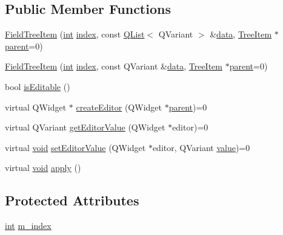 \subsection*{Public Member Functions}
\begin{DoxyCompactItemize}
\item 
\hyperlink{group___u_a_v_object_browser_plugin_ga9ada7d4ed9c60eb20abec8cfc8e99960}{Field\-Tree\-Item} (\hyperlink{ioapi_8h_a787fa3cf048117ba7123753c1e74fcd6}{int} \hyperlink{glext_8h_ab47dd9958bcadea08866b42bf358e95e}{index}, const \hyperlink{class_q_list}{Q\-List}$<$ Q\-Variant $>$ \&\hyperlink{glext_8h_a8850df0785e6fbcc2351af3b686b8c7a}{data}, \hyperlink{class_tree_item}{Tree\-Item} $\ast$\hyperlink{group___u_a_v_object_browser_plugin_gaa3a7ba624312b6be70872634db291881}{parent}=0)
\item 
\hyperlink{group___u_a_v_object_browser_plugin_gab23936d93e6b5a9121347243b8121ddb}{Field\-Tree\-Item} (\hyperlink{ioapi_8h_a787fa3cf048117ba7123753c1e74fcd6}{int} \hyperlink{glext_8h_ab47dd9958bcadea08866b42bf358e95e}{index}, const Q\-Variant \&\hyperlink{glext_8h_a8850df0785e6fbcc2351af3b686b8c7a}{data}, \hyperlink{class_tree_item}{Tree\-Item} $\ast$\hyperlink{group___u_a_v_object_browser_plugin_gaa3a7ba624312b6be70872634db291881}{parent}=0)
\item 
bool \hyperlink{group___u_a_v_object_browser_plugin_ga9451c80f28fd4e9cf1039ccd6c5a578f}{is\-Editable} ()
\item 
virtual Q\-Widget $\ast$ \hyperlink{group___u_a_v_object_browser_plugin_ga06084172e5bbdc94cbe4af05faa1402a}{create\-Editor} (Q\-Widget $\ast$\hyperlink{group___u_a_v_object_browser_plugin_gaa3a7ba624312b6be70872634db291881}{parent})=0
\item 
virtual Q\-Variant \hyperlink{group___u_a_v_object_browser_plugin_ga1807c283f6304e53fc9d655e087ef1c0}{get\-Editor\-Value} (Q\-Widget $\ast$editor)=0
\item 
virtual \hyperlink{group___u_a_v_objects_plugin_ga444cf2ff3f0ecbe028adce838d373f5c}{void} \hyperlink{group___u_a_v_object_browser_plugin_gaaa08b0cb3b19768b9dad7281248ce90b}{set\-Editor\-Value} (Q\-Widget $\ast$editor, Q\-Variant \hyperlink{glext_8h_aa0e2e9cea7f208d28acda0480144beb0}{value})=0
\item 
virtual \hyperlink{group___u_a_v_objects_plugin_ga444cf2ff3f0ecbe028adce838d373f5c}{void} \hyperlink{group___u_a_v_object_browser_plugin_gac0c6018349019bfac1859518a7403871}{apply} ()
\end{DoxyCompactItemize}
\subsection*{Protected Attributes}
\begin{DoxyCompactItemize}
\item 
\hyperlink{ioapi_8h_a787fa3cf048117ba7123753c1e74fcd6}{int} \hyperlink{group___u_a_v_object_browser_plugin_gab2e489418a60e96de39035e776c4e1e6}{m\-\_\-index}
\end{DoxyCompactItemize}
